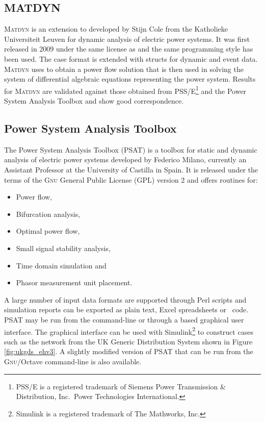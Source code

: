 \subsection*{MATDYN}
\textsc{Matdyn} is an extension to \matpower developed by Stijn Cole from the
Katholieke Universiteit Leuven for dynamic analysis of electric power systems.
It was first released in 2009 under the same license as \matpower and the
same programming style has been used.  The \matpower case format is extended
with structs for dynamic and event data.  \textsc{Matdyn} uses \matpower to obtain a power
flow solution that is then used in solving the system of differential
algebraic equations representing the power system.  Results for \textsc{Matdyn}
are validated against those obtained from PSS/E\footnote{PSS/E is a
registered trademark of Siemens Power Transmission \& Distribution, Inc.~Power
Technologies International.} and the Power System Analysis Toolbox and show
good correspondence.

\subsection*{Power System Analysis Toolbox}
\label{sec:psat}
The Power System Analysis Toolbox (PSAT) is a \matlab toolbox for static and
dynamic analysis of electric power systems developed by Federico Milano,
currently an Assistant Professor at the University of Castilla in Spain. It is
released under the terms of the \textsc{Gnu} General Public License (GPL)
version 2 and offers routines for:
\begin{itemize}
	\item Power flow,
	\item Bifurcation analysis,
	\item Optimal power flow,
	\item Small signal stability analysis,
	\item Time domain simulation and
	\item Phasor measurement unit placement.
\end{itemize}
A large number of input data formats are supported through Perl scripts and
simulation reports can be exported as plain text, Excel spreadsheets or
\LaTeXe~code.  PSAT may be run from the \matlab command-line or through a
\matlab based graphical user interface.  The graphical interface can be used with
Simulink\footnote{Simulink is a registered trademark of The Mathworks, Inc.}
to construct cases such as the network from the UK Generic Distribution System
shown in Figure \ref{fig:ukgds_ehv3}.  A slightly modified version of PSAT that
can be run from the \textsc{Gnu}/Octave command-line is also available.

